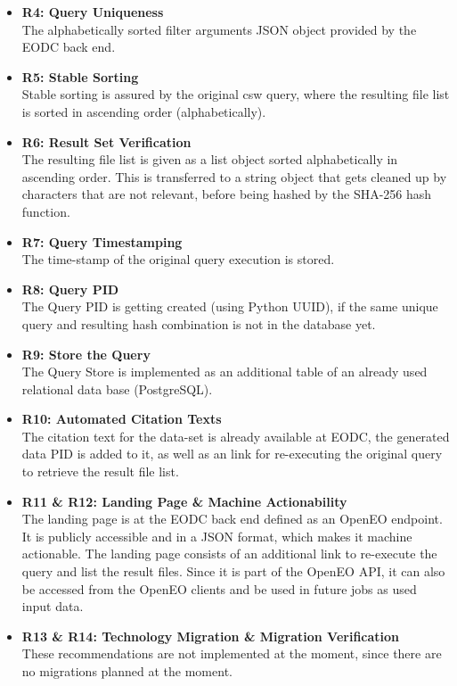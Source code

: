 \documentclass[draft,final]{vutinfth} %
\begin{document}
\begin{itemize}
\begin{itemize}
	\end{itemize}
	\item \textbf{R4: Query Uniqueness} \\
	The alphabetically sorted filter arguments JSON object provided by the EODC back end.
	\item \textbf{R5: Stable Sorting} \\
	Stable sorting is assured by the original \acrshort{csw} query, where the resulting file list is sorted in ascending order (alphabetically).
	\item \textbf{R6: Result Set Verification} \\
	The resulting file list is given as a list object sorted alphabetically in ascending order. This is transferred to a string object that gets cleaned up by characters that are not relevant, before being hashed by the SHA-256 hash function. 
	\item \textbf{R7: Query Timestamping} \\
	The time-stamp of the original query execution is stored. 
	\item \textbf{R8: Query PID}\\
	The Query PID is getting created (using Python UUID), if the same unique query and resulting hash combination is not in the database yet.
	\item \textbf{R9: Store the Query} \\
	The Query Store is implemented as an additional table of an already used relational data base (PostgreSQL). 
	\item \textbf{R10: Automated Citation Texts} \\
	The citation text for the data-set is already available at EODC, the generated data PID is added to it, as well as an link for re-executing the original query to retrieve the result file list. 
	\item \textbf{R11 \& R12: Landing Page \& Machine Actionability} \\
	The landing page is at the EODC back end defined as an OpenEO endpoint. It is publicly accessible and in a JSON format, which makes it machine actionable. The landing page consists of an additional link to re-execute the query and list the result files. Since it is part of the OpenEO API, it can also be accessed from the OpenEO clients and be used in future jobs as used input data.
	\item \textbf{R13 \& R14: Technology Migration \& Migration Verification} \\
	These recommendations are not implemented at the moment, since there are no migrations planned at the moment.
\end{itemize}
\end{document}
